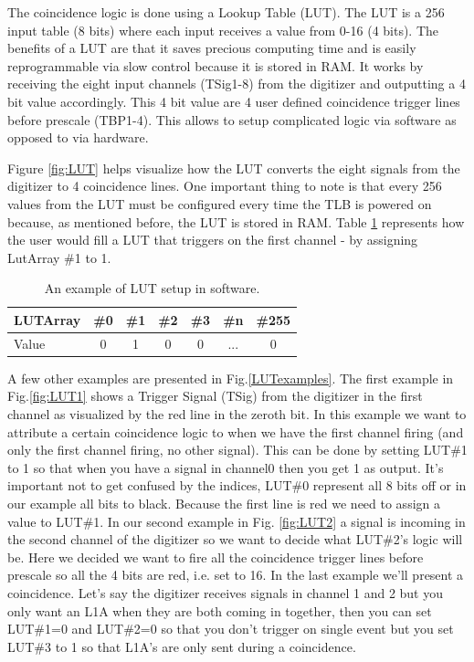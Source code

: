 The coincidence logic is done using a Lookup Table (LUT). The LUT is a 256 input table (8 bits) where each input receives a value from 0-16 (4 bits). The benefits of a LUT are that it saves precious computing time and is easily reprogrammable via slow control because it is stored in RAM. It works by receiving the eight input channels (TSig1-8) from the digitizer and outputting a 4 bit value accordingly. This 4 bit value are 4 user defined coincidence trigger lines before prescale (TBP1-4). This allows to setup complicated logic via software as opposed to via hardware.

Figure \ref{fig:LUT} helps visualize how the LUT converts the eight signals from the digitizer to 4 coincidence lines. One important thing to note is that every 256 values from the LUT must be configured every time the TLB is powered on because, as mentioned before, the LUT is stored in RAM. Table \ref{table:LUTtable} represents how the user would fill a LUT that triggers on the first channel - by assigning LutArray \#1 to 1.

\begin{table}[htbp!] 
\caption{An example of LUT setup in software.}
\centering
\label{table:LUTtable}
\begin{tabular}{l c c c c c c}
\toprule
LUTArray & \#0 & \#1 & \#2 & \#3 & \#n & \#255 \\
\midrule
Value & 0 & 1 & 0  & 0 & ... & 0 \\
\bottomrule
\end{tabular}
\end{table}

A few other examples are presented in Fig.\ref{LUTexamples}. The first example in Fig.\ref{fig:LUT1} shows a Trigger Signal (TSig) from the digitizer in the first channel as visualized by the red line in the zeroth bit. In this example we want to attribute a certain coincidence logic to when we have the first channel firing (and only the first channel firing, no other signal). This can be done by setting LUT\#1 to 1 so that when you have a signal in channel0 then you get 1 as output. It's important not to get confused by the indices, LUT\#0 represent all 8 bits off or in our example all bits to black. Because the first line is red we need to assign a value to LUT\#1. In our second example in Fig. \ref{fig:LUT2} a signal is incoming in the second channel of the digitizer so we want to decide what LUT\#2's logic will be. Here we decided we want to fire all the coincidence trigger lines before prescale so all the 4 bits are red, i.e. set to 16. In the last example we'll present a coincidence. Let's say the digitizer receives signals in channel 1 and 2 but you only want an L1A when they are both coming in together, then you can set LUT\#1=0 and LUT\#2=0 so that you don't trigger on single event but you set LUT\#3 to 1 so that L1A's are only sent during a coincidence.

